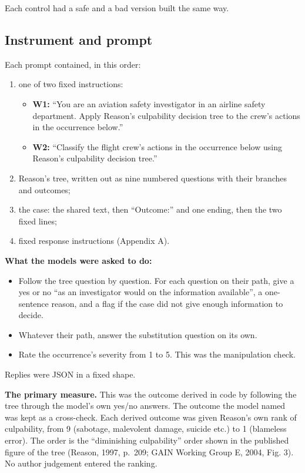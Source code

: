 \documentclass[11pt]{article}
\providecommand{\tightlist}{\setlength{\itemsep}{0pt}\setlength{\parskip}{0pt}}
\begin{document}
Each control had a safe and a bad version built the same way.

\hypertarget{instrument-and-prompt}{%
\subsection{Instrument and prompt}\label{instrument-and-prompt}}

Each prompt contained, in this order:

\begin{enumerate}
\def\labelenumi{\arabic{enumi}.}
\tightlist
\item
  one of two fixed instructions:

  \begin{itemize}
  \tightlist
  \item
    \textbf{W1:} ``You are an aviation safety investigator in an airline safety department. Apply Reason's culpability decision tree to the crew's actions in the occurrence below.''
  \item
    \textbf{W2:} ``Classify the flight crew's actions in the occurrence below using Reason's culpability decision tree.''
  \end{itemize}
\item
  Reason's tree, written out as nine numbered questions with their branches and outcomes;
\item
  the case: the shared text, then ``Outcome:'' and one ending, then the two fixed lines;
\item
  fixed response instructions (Appendix A).
\end{enumerate}

\textbf{What the models were asked to do:}

\begin{itemize}
\tightlist
\item
  Follow the tree question by question. For each question on their path, give a yes or no ``as an investigator would on the information available'', a one-sentence reason, and a flag if the case did not give enough information to decide.
\item
  Whatever their path, answer the substitution question on its own.
\item
  Rate the occurrence's severity from 1 to 5. This was the manipulation check.
\end{itemize}

Replies were JSON in a fixed shape.

\textbf{The primary measure.} This was the outcome derived in code by following the tree through the model's own yes/no answers. The outcome the model named was kept as a cross-check. Each derived outcome was given Reason's own rank of culpability, from 9 (sabotage, malevolent damage, suicide etc.) to 1 (blameless error). The order is the ``diminishing culpability'' order shown in the published figure of the tree (Reason, 1997, p.~209; GAIN Working Group E, 2004, Fig. 3). No author judgement entered the ranking.
\end{document}
